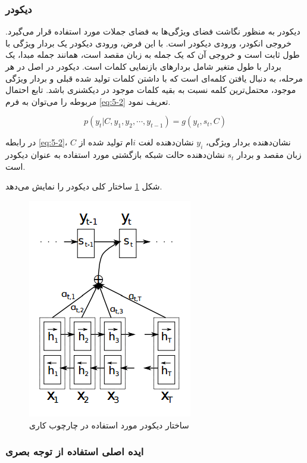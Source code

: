 \subsubsection{دیکودر}

 دیکودر به منظور نگاشت فضای ویژگی‌ها به فضای جملات مورد استفاده قرار می‌گیرد. خروجی انکودر، ورودی دیکودر است. با این فرض، ورودی دیکودر یک بردار ویژگی با طول ثابت است و خروجی آن که یک جمله به زبان مقصد است، همانند جمله مبدا، یک بردار با طول متغیر شامل بردارهای بازنمایی کلمات است. دیکودر در اصل در هر مرحله، به دنبال یافتن کلمه‌ای است که با داشتن کلمات تولید شده قبلی و بردار ویژگی موجود، محتمل‌ترین کلمه نسبت به بقیه کلمات موجود در دیکشنری باشد. تابع احتمال مربوطه را می‌توان به فرم \eqref{eq:5-2} تعریف نمود.
 
 \begin{equation}
 p(y_t | C, y_1, y_2, \cdots, y_{t-1}) = g(y_t, s_t, C)
 \label{eq:5-2}
 \end{equation}

در رابطه \eqref{eq:5-2}، $C$ نشان‌دهنده بردار ویژگی‌، $y_i$ نشان‌دهنده لغت $i$ام تولید شده از زبان مقصد و بردار $s_t$ نشان‌دهنده حالت شبکه بازگشتی مورد استفاده به عنوان دیکودر است.


 شکل \ref{fig:decoder} ساختار کلی دیکودر را نمایش می‌دهد.

\begin{figure}[h]
\centering
\includegraphics[scale=0.7]{Imgs/5-decoder.png}
\caption{ساختار دیکودر مورد استفاده در چارچوب کاری \cite{bahdanau2014neural}}
\label{fig:decoder}
\end{figure}

\subsubsection{ایده اصلی استفاده از توجه بصری}

